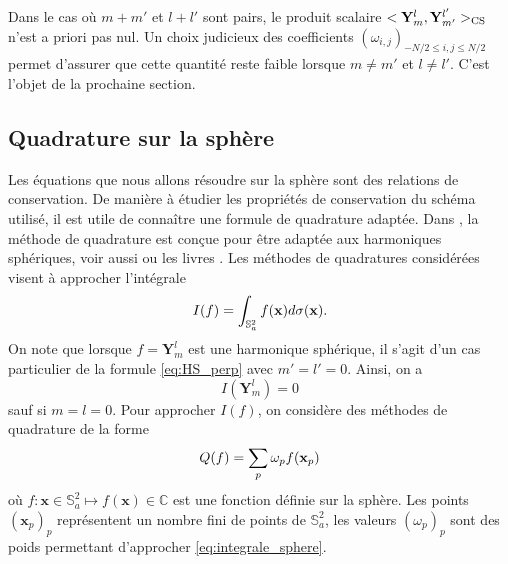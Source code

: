 Dans le cas où $m+m'$ et $l+l'$ sont pairs, le produit scalaire $<\mathbf{Y}_m^l, \mathbf{Y}_{m'}^{l'}>_{\text{CS}}$ n'est a priori pas nul. Un choix judicieux des coefficients $(\omega_{i,j})_{-N/2 \leq i,j  \leq N/2}$ permet d'assurer que cette quantité reste faible lorsque $m \neq m'$ et $l \neq l'$. C'est l'objet de la prochaine section.








































\subsection{Quadrature sur la sphère}

Les équations que nous allons résoudre sur la sphère sont des relations de conservation. De manière à étudier les propriétés de conservation du schéma utilisé, il est utile de connaître une formule de quadrature adaptée. Dans \cite{Ahrens2009, Fornberg2014}, la méthode de quadrature est conçue pour être adaptée aux harmoniques sphériques, voir aussi \cite{Mclaren1963} ou les livres \cite{Atkinson2012, Hesse2010}. Les méthodes de quadratures considérées visent à approcher l'intégrale
\begin{equation}
I(f) = \displaystyle\int_{\mathbb{S}_a^2} f(\mathbf{x}) d \sigma(\mathbf{x}).
\label{eq:integrale_sphere}
\end{equation}
On note que lorsque $f = \mathbf{Y}_m^l$ est une harmonique sphérique, il s'agit d'un cas particulier de la formule \eqref{eq:HS_perp} avec $m'=l'=0$. Ainsi, on a 
\begin{equation}
I(\mathbf{Y}_m^l) = 0
\end{equation}
sauf si $m=l=0$.
Pour approcher $I(f)$, on considère des méthodes de quadrature de la forme
\begin{equation}
Q(f) = \displaystyle\sum\limits_p \omega_p f(\mathbf{x}_p)
\label{eq:quadrature_sphere}
\end{equation}
où $f : \mathbf{x} \in \mathbb{S}_a^2 \mapsto f(\mathbf{x}) \in \mathbb{C}$ est une fonction définie sur la sphère. Les points $(\mathbf{x}_p)_p$ représentent un nombre fini de points de $\mathbb{S}_a^2$, les valeurs $(\omega_p)_p$ sont des poids permettant d'approcher \eqref{eq:integrale_sphere}.

